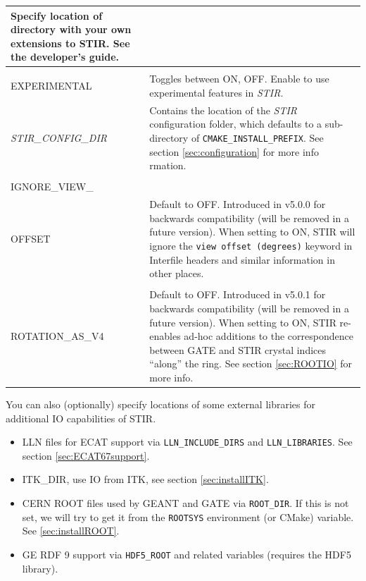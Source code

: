 \documentclass{article}
\begin{document}
\begin{longtable}{|p{\MakeTableFirstCol}|p{\MakeTableSecondCol}|}
{\raggedright Specify location of directory with your own extensions to STIR. See
the developer's guide.}\\
\hline
{\raggedright \textit{STIR\_ENABLE\_\\EXPERIMENTAL}} & 
{\raggedright Toggles between ON, OFF. Enable to use experimental features in \textit{STIR}.}\\
\hline
{\raggedright \textit{STIR\_CONFIG\_DIR}} & 
{\raggedright Contains the location of the \textit{STIR} configuration folder, which defaults to a sub-directory of \texttt{CMAKE\_INSTALL\_PREFIX}. See section \ref{sec:configuration} for more info
rmation.}\\
\hline
{\raggedright \textit{STIR\_LEGACY\_\\IGNORE\_VIEW\_\\OFFSET}} & 
{\raggedright Default to OFF. Introduced in v5.0.0 for backwards compatibility (will be removed in a future version).
When setting to ON, STIR will ignore the \texttt{view offset (degrees)} keyword in Interfile headers and similar information in other places.}\\
\hline
{\raggedright \textit{STIR\_ROOT\_\\ROTATION\_AS\_V4}} & 
{\raggedright Default to OFF. Introduced in v5.0.1 for backwards compatibility (will be removed in a future version).
When setting to ON, STIR re-enables ad-hoc additions to the correspondence between GATE and STIR crystal indices ``along'' the ring.
See section \ref{sec:ROOTIO} for more info.}\\
\hline
\end{longtable}

You can also (optionally) specify locations of some external libraries for additional IO
capabilities of STIR. 
\begin{itemize}
\item LLN files for ECAT support via \texttt{LLN\_INCLUDE\_DIRS} and \texttt{LLN\_LIBRARIES}.
See section \ref{sec:ECAT67support}.
\item ITK\_DIR, use IO from ITK, see section \ref{sec:installITK}.
\item CERN ROOT files used by GEANT and GATE via \texttt{ROOT\_DIR}.
  If this is not set, we will try to get it from the \texttt{ROOTSYS} environment (or CMake) variable.
  See \ref{sec:installROOT}.
\item GE RDF\texttrademark{} 9 support via \texttt{HDF5\_ROOT} and related variables (requires the HDF5 library).
\end{itemize}
\end{document}

